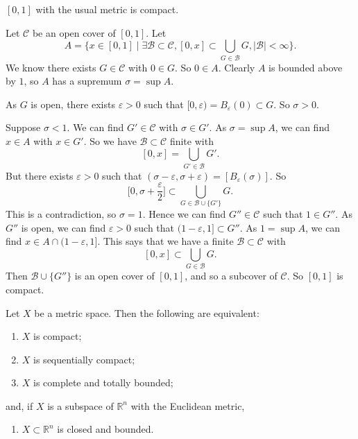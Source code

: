 \documentclass[12pt]{article}
\begin{document}
\begin{proposition}
	$[0, 1]$ with the usual metric is compact.
\end{proposition}

\begin{proofbox}
	Let $\mathcal{C}$ be an open cover of $[0, 1]$. Let 
	\[
		A = \{x \in [0, 1] \mid \exists \mathcal{B} \subset \mathcal{C}, [0, x] \subset \bigcup_{G \in \mathcal{B}} G, |\mathcal{B}| < \infty \}
	.\]
	We know there exists $G \in \mathcal{C}$ with $0 \in G$. So $0 \in A$. Clearly $A$ is bounded above by $1$, so $A$ has a supremum $\sigma = \sup A$.

	As $G$ is open, there exists $\varepsilon > 0$ such that $[0, \varepsilon) = B_{\varepsilon}(0) \subset G$. So $\sigma > 0$.

	Suppose $\sigma < 1$. We can find $G' \in \mathcal{C}$ with $\sigma \in G'$. As $\sigma = \sup A$, we can find $x \in A$ with $x \in G'$. So we have $\mathcal{B} \subset \mathcal{C}$ finite with
	 \[
		 [0, x] = \bigcup_{G' \in \mathcal{B}}G'
	.\]
	But there exists $\varepsilon > 0$ such that $(\sigma - \varepsilon, \sigma + \varepsilon) = [B_{\varepsilon}(\sigma)]$. So
	\[
		\biggl[0, \sigma + \frac{\varepsilon}{2}\biggr] \subset \bigcup_{G \in \mathcal{B} \cup \{G'\}}G
	.\]
	This is a contradiction, so $\sigma = 1$. Hence we can find $G'' \in \mathcal{C}$ such that $1 \in G''$. As $G''$ is open, we can find $\varepsilon > 0$ such that $(1 - \varepsilon, 1] \subset G''$. As $1 = \sup A$, we can find $x \in A \cap (1 - \varepsilon , 1]$. This says that we have a finite $\mathcal{B} \subset \mathcal{C}$ with
	 \[
		 [0, x] \subset \bigcup_{G \in \mathcal{B}}G
	.\]
	Then $\mathcal{B} \cup \{G''\}$ is an open cover of $[0, 1]$, and so a subcover of $\mathcal{C}$. So $[0, 1]$ is compact.
\end{proofbox}

\begin{theorem}
	Let $X$ be a metric space. Then the following are equivalent:
	\begin{enumerate}[\normalfont(i)]
		\item $X$ is compact;
		\item $X$ is sequentially compact;
		\item $X$ is complete and totally bounded;
	\end{enumerate}
	and, if $X$ is a subspace of $\mathbb{R}^{n}$ with the Euclidean metric,
	\begin{enumerate}[resume*]
		\item $X \subset \mathbb{R}^{n}$ is closed and bounded.
	\end{enumerate}
\end{theorem}
\end{document}
